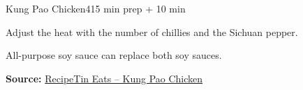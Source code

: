 \begin{recipebox}{Kung Pao Chicken}{4}{15 min prep + 10 min}
\begin{notelist}
  \item Adjust the heat with the number of chillies and the Sichuan pepper.
  \item All-purpose soy sauce can replace both soy sauces.
\end{notelist}

\noindent\textbf{Source:} \href{https://www.recipetineats.com/kung-pao-chicken/}{RecipeTin Eats -- Kung Pao Chicken}

\end{recipebox}

